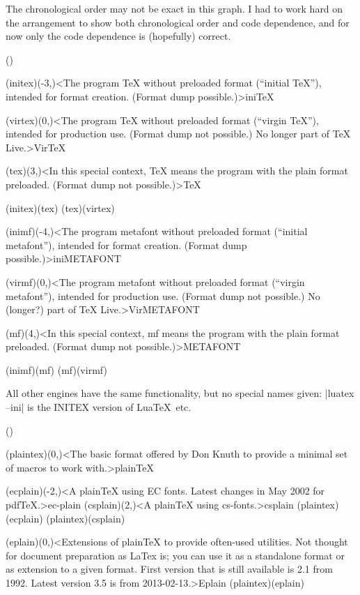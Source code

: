 {\flushleft The chronological order may not be exact in this graph. I had to work hard on the arrangement to show both chronological order and code dependence, and for now only the code dependence is (hopefully) correct.

} 

\clearpage


\tograph(){
	\tonode(initex)(-3,\layer)<The program TeX without preloaded format (“initial TeX”), intended for format creation. (Format dump possible.)>{ini\TeX}

	\tonode(virtex)(0,\layer)<The program TeX without preloaded format (“virgin TeX”), intended for production use. (Format dump not possible.) No longer part of TeX Live.>{Vir\TeX}

	\tonode(tex)(3,\layer)<In this special context, TeX means the program with the plain format preloaded. (Format dump not possible.)>{\TeX}

	\todraw(initex)(tex)
	\todraw(tex)(virtex)

\steplayer[-2]

	\tonode(inimf)(-4,\layer)<The program metafont without preloaded format (“initial metafont”), intended for format creation. (Format dump possible.)>{iniMETAFONT}

	\tonode(virmf)(0,\layer)<The program metafont without preloaded format (“virgin metafont”), intended for production use. (Format dump not possible.) No (longer?) part of TeX Live.>{VirMETAFONT}

	\tonode(mf)(4,\layer)<In this special context, mf means the program with the plain format preloaded. (Format dump not possible.)>{METAFONT}

	\todraw(inimf)(mf)
	\todraw(mf)(virmf)

}

{\flushleft All other engines have the same functionality, but no special names given: |luatex --ini| is the INITEX version of Lua\TeX\ etc.

}

\tograph(){
	\tonode(plaintex)(0,\layer)<The basic format offered by Don Knuth to provide a minimal set of macros to work with.>{plain\TeX}
\steplayer[-2]

	\tonode[\experimental](ecplain)(-2,\layer)<A plainTeX using EC fonts. Latest changes in May 2002 for pdfTeX.>{ec-plain}
	\tonode[\experimental](csplain)(2,\layer)<A plainTeX using cs-fonts.>{csplain}
	\todraw(plaintex)(ecplain)
	\todraw(plaintex)(csplain)

\steplayer[-2]
	\tonode[\experimental](eplain)(0,\layer)<Extensions of plainTeX to provide often-used utilities. Not thought for document preparation as LaTex is; you can use it as a standalone format or as extension to a given format. First version that is still available is 2.1 from 1992. Latest version 3.5 is from 2013-02-13.>{Eplain}
	\todraw(plaintex)(eplain)
}
\clearpage

